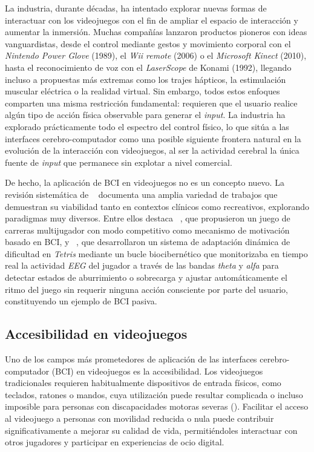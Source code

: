 La industria, durante décadas, ha intentado explorar nuevas formas de interactuar con los videojuegos con el fin de ampliar el espacio de interacción y aumentar la inmersión. Muchas compañías lanzaron productos pioneros con ideas vanguardistas, desde el control mediante gestos y movimiento corporal con el \textit{Nintendo Power Glove} (1989), el \textit{Wii remote} (2006) o el \textit{Microsoft Kinect} (2010), hasta el reconocimiento de voz con el \textit{LaserScope} de Konami (1992), llegando incluso a propuestas más extremas como los trajes hápticos, la estimulación muscular eléctrica o la realidad virtual. Sin embargo, todos estos enfoques comparten una misma restricción fundamental: requieren que el usuario realice algún tipo de acción física observable para generar el \textit{input}. La industria ha explorado prácticamente todo el espectro del control físico, lo que sitúa a las interfaces cerebro-computador como una posible siguiente frontera natural en la evolución de la interacción con videojuegos, al ser la actividad cerebral la única fuente de \textit{input} que permanece sin explotar a nivel comercial.

De hecho, la aplicación de BCI en videojuegos no es un concepto nuevo. La revisión sistemática de ~\cite{kerous2018eeg} documenta una amplia variedad de trabajos que demuestran su viabilidad tanto en contextos clínicos como recreativos, explorando paradigmas muy diversos. Entre ellos destaca ~\cite{li2013competitive}, que propusieron un juego de carreras multijugador con modo competitivo como mecanismo de motivación basado en BCI, y ~\cite{ewing2016evaluation}, que desarrollaron un sistema de adaptación dinámica de dificultad en \textit{Tetris} mediante un bucle biocibernético que monitorizaba en tiempo real la actividad \textit{EEG} del jugador a través de las bandas \textit{theta} y \textit{alfa} para detectar estados de aburrimiento o sobrecarga y ajustar automáticamente el ritmo del juego sin requerir ninguna acción consciente por parte del usuario, constituyendo un ejemplo de BCI pasiva.

\subsection{Accesibilidad en videojuegos}
\label{subsec:AccesibilidadVideojuegos}

Uno de los campos más prometedores de aplicación de las interfaces cerebro-computador (BCI) en videojuegos es la accesibilidad. Los videojuegos tradicionales requieren habitualmente dispositivos de entrada físicos, como teclados, ratones o mandos, cuya utilización puede resultar complicada o incluso imposible para personas con discapacidades motoras severas (\cite{yuan2008game}). Facilitar el acceso al videojuego a personas con movilidad reducida o nula puede contribuir significativamente a mejorar su calidad de vida, permitiéndoles interactuar con otros jugadores y participar en experiencias de ocio digital.

